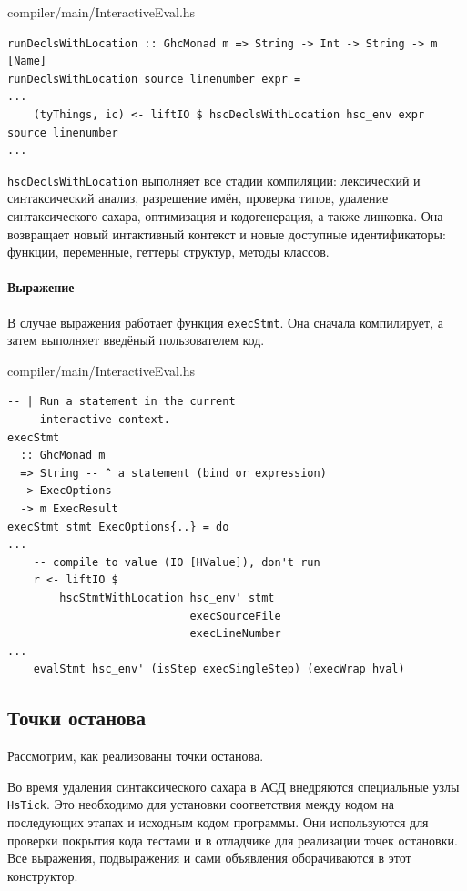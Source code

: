\documentclass[fontsize=14pt, paper=a4, pagesize, DIV=calc]{scrartcl}
\def\code#1{\texttt{#1}}
\begin{document}
\begin{ListingEnv}
\caption{compiler/main/InteractiveEval.hs}
\begin{lstlisting}[firstnumber=199]
runDeclsWithLocation :: GhcMonad m => String -> Int -> String -> m [Name]
runDeclsWithLocation source linenumber expr =
...
    (tyThings, ic) <- liftIO $ hscDeclsWithLocation hsc_env expr source linenumber
...
\end{lstlisting}
\end{ListingEnv}

\code{hscDeclsWithLocation} выполняет все стадии компиляции: лексический и
синтаксический анализ, разрешение имён, проверка типов, удаление
синтаксического сахара, оптимизация и кодогенерация, а также линковка.  Она
возвращает новый интактивный контекст и новые доступные идентификаторы:
функции, переменные, геттеры структур, методы классов.

\paragraph{Выражение}

В случае выражения работает функция \code{execStmt}. Она сначала компилирует, а
затем выполняет введёный пользователем код.

\begin{ListingEnv}
\caption{compiler/main/InteractiveEval.hs}
\begin{lstlisting}
-- | Run a statement in the current 
     interactive context.
execStmt
  :: GhcMonad m
  => String -- ^ a statement (bind or expression)
  -> ExecOptions
  -> m ExecResult
execStmt stmt ExecOptions{..} = do
...
    -- compile to value (IO [HValue]), don't run
    r <- liftIO $ 
        hscStmtWithLocation hsc_env' stmt 
                            execSourceFile 
                            execLineNumber
...
    evalStmt hsc_env' (isStep execSingleStep) (execWrap hval)
\end{lstlisting}
\end{ListingEnv}

\subsection{Точки останова}

Рассмотрим, как реализованы точки останова.

Во время удаления синтаксического сахара в АСД внедряются специальные узлы
\code{HsTick}. Это необходимо для установки соответствия между кодом на
последующих этапах и исходным кодом программы. Они используются для проверки
покрытия кода тестами и в отладчике для реализации точек остановки. Все
выражения, подвыражения и сами объявления оборачиваются в этот конструктор.
\end{document}
